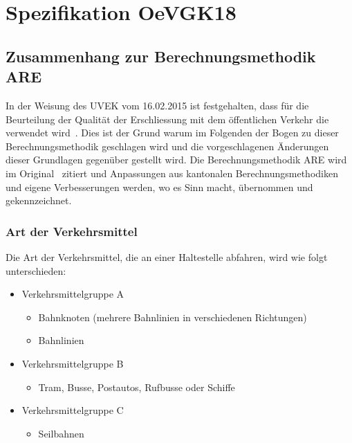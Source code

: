 \cleardoublepage
\section{Spezifikation OeVGK18}
\label{Spezifikation OeVGK18}

\subsection{Zusammenhang zur Berechnungsmethodik ARE}
\label{Spezifikation OeVGK18:Zusammenhang zur Berechnungsmethodik ARE}

In der Weisung des \acs{UVEK} vom 16.02.2015 ist festgehalten, dass für die Beurteilung der Qualität der Erschliessung mit dem öffentlichen Verkehr die  verwendet wird~\cite{weisung_uvek}.
Dies ist der Grund warum im Folgenden der Bogen zu dieser Berechnungsmethodik geschlagen wird und die vorgeschlagenen Änderungen dieser Grundlagen gegenüber gestellt wird.
Die Berechnungsmethodik \acs{ARE} wird im Original~\cite{berechnung_are} zitiert und Anpassungen aus kantonalen Berechnungsmethodiken und eigene Verbesserungen werden, wo es Sinn macht, übernommen und gekennzeichnet.

\subsubsection{Art der Verkehrsmittel}
\label{Zusammenhang zur Berechnungsmethodik ARE:Art der Verkehrsmittel}

\begin{itquote}
Die Art der Verkehrsmittel, die an einer \gls{Haltestelle} abfahren, wird wie folgt unterschieden:
\begin{itemize}[noitemsep]
    \item Verkehrsmittelgruppe A
    \begin{itemize}
        \item Bahnknoten (mehrere Bahnlinien in verschiedenen Richtungen)
        \item Bahnlinien
    \end{itemize}
    \item Verkehrsmittelgruppe B
    \begin{itemize}
        \item Tram, Busse, Postautos, Rufbusse oder Schiffe
    \end{itemize}
    \item Verkehrsmittelgruppe C
    \begin{itemize}
        \item Seilbahnen
    \end{itemize}
\end{itemize}
\end{itquote}

